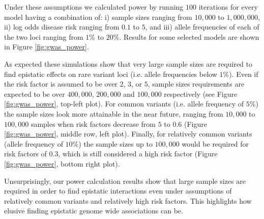 Under these assumptions we calculated power by running $100$ iterations for every model having a combination of: 
i) sample sizes ranging from $10,000$ to $1,000,000$,
ii) log odds disease risk ranging from $0.1$ to $5$,
and 
iii) allele frequencies of each of the two loci ranging from $1\%$ to $20\%$.
Results for some selected models are shown in Figure \ref{fig:gwas_power}.


As expected these simulations show that very large sample sizes are required to find epistatic effects on rare variant loci (i.e. allele frequencies below $1\%$).
Even if the risk factor is assumed to be over $2$, $3$, or $5$, sample sizes requirements are expected to be over $400,000$, $200,000$ and $100,000$ respectively (see Figure \ref{fig:gwas_power}, top-left plot).
For common variants (i.e. allele frequency of $5\%$) the sample sizes look more attainable in the near future, ranging from $10,000$ to $100,000$ samples when risk factors decrease from $5$ to $0.6$ (Figure \ref{fig:gwas_power}, middle row, left plot).
Finally, for relatively common variants (allele frequency of $10\%$) the sample sizes up to $100,000$ would be required for risk factors of $0.3$, which is still considered a high risk factor (Figure \ref{fig:gwas_power}, bottom right plot).

Unsurprisingly, our power calculation results show that large sample sizes are required in order to find epistatic interactions even under assumptions of relatively common variants and relatively high risk factors.
This highlights how elusive finding epistatic genome wide associations can be.

